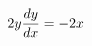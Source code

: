 \documentclass[preview]{standalone}
\begin{document}
\begin{align*}
2y {dy \over dx} = -2x
\end{align*}
\end{document}
